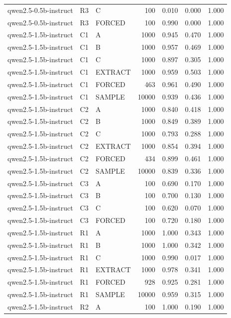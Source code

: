 \begin{table}
\begin{tabular}{lllrrrr}
qwen2.5-0.5b-instruct & R3 & C & 100 & 0.010 & 0.000 & 1.000 \\
qwen2.5-0.5b-instruct & R3 & FORCED & 100 & 0.990 & 0.000 & 1.000 \\
qwen2.5-1.5b-instruct & C1 & A & 1000 & 0.945 & 0.470 & 1.000 \\
qwen2.5-1.5b-instruct & C1 & B & 1000 & 0.957 & 0.469 & 1.000 \\
qwen2.5-1.5b-instruct & C1 & C & 1000 & 0.897 & 0.305 & 1.000 \\
qwen2.5-1.5b-instruct & C1 & EXTRACT & 1000 & 0.959 & 0.503 & 1.000 \\
qwen2.5-1.5b-instruct & C1 & FORCED & 463 & 0.961 & 0.490 & 1.000 \\
qwen2.5-1.5b-instruct & C1 & SAMPLE & 10000 & 0.939 & 0.436 & 1.000 \\
qwen2.5-1.5b-instruct & C2 & A & 1000 & 0.840 & 0.418 & 1.000 \\
qwen2.5-1.5b-instruct & C2 & B & 1000 & 0.849 & 0.389 & 1.000 \\
qwen2.5-1.5b-instruct & C2 & C & 1000 & 0.793 & 0.288 & 1.000 \\
qwen2.5-1.5b-instruct & C2 & EXTRACT & 1000 & 0.854 & 0.394 & 1.000 \\
qwen2.5-1.5b-instruct & C2 & FORCED & 434 & 0.899 & 0.461 & 1.000 \\
qwen2.5-1.5b-instruct & C2 & SAMPLE & 10000 & 0.839 & 0.336 & 1.000 \\
qwen2.5-1.5b-instruct & C3 & A & 100 & 0.690 & 0.170 & 1.000 \\
qwen2.5-1.5b-instruct & C3 & B & 100 & 0.700 & 0.130 & 1.000 \\
qwen2.5-1.5b-instruct & C3 & C & 100 & 0.620 & 0.070 & 1.000 \\
qwen2.5-1.5b-instruct & C3 & FORCED & 100 & 0.720 & 0.180 & 1.000 \\
qwen2.5-1.5b-instruct & R1 & A & 1000 & 1.000 & 0.343 & 1.000 \\
qwen2.5-1.5b-instruct & R1 & B & 1000 & 1.000 & 0.342 & 1.000 \\
qwen2.5-1.5b-instruct & R1 & C & 1000 & 0.990 & 0.017 & 1.000 \\
qwen2.5-1.5b-instruct & R1 & EXTRACT & 1000 & 0.978 & 0.341 & 1.000 \\
qwen2.5-1.5b-instruct & R1 & FORCED & 928 & 0.925 & 0.281 & 1.000 \\
qwen2.5-1.5b-instruct & R1 & SAMPLE & 10000 & 0.959 & 0.315 & 1.000 \\
qwen2.5-1.5b-instruct & R2 & A & 100 & 1.000 & 0.190 & 1.000 \\

\end{tabular}
\end{table}
